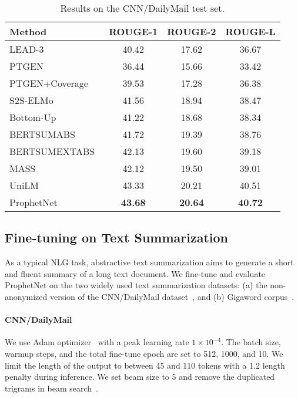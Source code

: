 \documentclass[11pt,a4paper]{article}
\begin{document}
\begin{table*}[th] 
\small
\begin{center}
  \begin{tabular}{lccc}
    \toprule
 Method & ROUGE-1 & ROUGE-2 & ROUGE-L \\
 \midrule
LEAD-3~\cite{nallapati2017summarunner} &40.42 &17.62 &36.67 \\
PTGEN~\cite{see2017get}  & 36.44 & 15.66 & 33.42\\
PTGEN+Coverage~\cite{see2017get}  &39.53 &17.28 &36.38\\
S2S-ELMo~\cite{edunov2019pre}  & 41.56 & 18.94 & 38.47\\
Bottom-Up~\cite{gehrmann2018bottom}  & 41.22 & 18.68 & 38.34\\
  BERTSUMABS~\cite{liu2019text} & 41.72 & 19.39 & 38.76\\
BERTSUMEXTABS~\cite{liu2019text} & 42.13 & 19.60 &39.18 \\ 
  MASS~\cite{song2019mass} & 42.12  &19.50&  39.01\\
 UniLM~\cite{dong2019unified} & 43.33  &20.21&   40.51\\
  \hline
  ProphetNet &\textbf{43.68} & \textbf{20.64} &  \textbf{40.72}\\
 \bottomrule
\end{tabular}
\end{center}
\caption{Results on the CNN/DailyMail test set.}
\label{tab:cnn} 
\end{table*}



\subsection{Fine-tuning on Text Summarization}\label{sec:exp2}
As a typical NLG task, abstractive text summarization aims to generate a short and fluent summary of a long text document.
We fine-tune and evaluate ProphetNet on the two widely used text summarization datasets: (a) the non-anonymized version of the CNN/DailyMail dataset~\cite{see2017get}, and (b) Gigaword corpus~\cite{rush2015neural}.

\paragraph{CNN/DailyMail} 
We use Adam optimizer~\cite{kingma2014adam} with a peak learning rate $1 \times 10^{-4}$.
The batch size, warmup steps, and the total fine-tune epoch are set to 512, 1000, and 10. 
We limit the length of the output to between 45 and 110 tokens with a 1.2 length penalty during inference. 
We set beam size to 5 and remove the duplicated trigrams in beam search~\cite{fan2017controllable}. 
\end{document}
